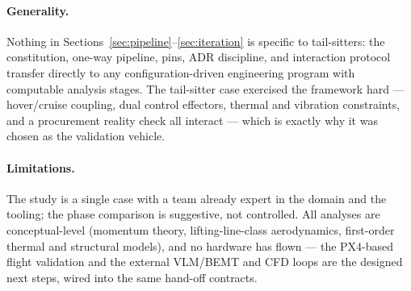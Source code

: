 \paragraph{Generality.} Nothing in
Sections~\ref{sec:pipeline}--\ref{sec:iteration} is specific to
tail-sitters: the constitution, one-way pipeline, pins, ADR
discipline, and interaction protocol transfer directly to any
configuration-driven engineering program with computable analysis
stages. The tail-sitter case exercised the framework hard ---
hover/cruise coupling, dual control effectors, thermal and vibration
constraints, and a procurement reality check all interact --- which is
exactly why it was chosen as the validation vehicle.

\paragraph{Limitations.} The study is a single case with a team
already expert in the domain and the tooling; the phase comparison is
suggestive, not controlled. All analyses are conceptual-level
(momentum theory, lifting-line-class aerodynamics, first-order thermal
and structural models), and no hardware has flown --- the PX4-based
flight validation and the external VLM/BEMT and CFD loops are the
designed next steps, wired into the same hand-off contracts.

